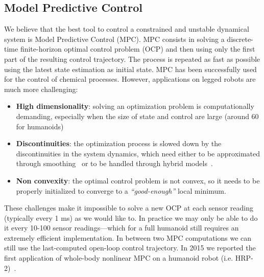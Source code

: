 \subsection{Model Predictive Control}
We believe that the best tool to control a constrained and unstable dynamical system is Model Predictive Control (MPC).
MPC consists in solving a discrete-time finite-horizon optimal control problem (OCP) and then using only the first part of the resulting control trajectory.
The process is repeated as fast as possible using the latest state estimation as initial state.
MPC has been successfully used for the control of chemical processes.
However, applications on legged robots are much more challenging:
\begin{itemize}
\item \textbf{High dimensionality}: solving an optimization problem is computationally demanding, especially when the size of state and control are large (around 60 for humanoids)
\item \textbf{Discontinuities}: the optimization process is slowed down by the discontinuities in the system dynamics, which need either to be approximated through smoothing~\cite{Todorov} or to be handled through hybrid models~\cite{Diehl2009a}.
\item \textbf{Non convexity}: the optimal control problem is not convex, so it needs to be properly initialized to converge to a \emph{``good-enough''} local minimum.
\end{itemize}
These challenges make it impossible to solve a new OCP at each sensor reading (typically every 1 ms) as we would like to. 
In practice we may only be able to do it every 10-100 sensor readings---which for a full humanoid still requires an extremely efficient implementation. 
In between two MPC computations we can still use the last-computed open-loop control trajectory.
In 2015 we reported the first application of whole-body nonlinear MPC on a humanoid robot (i.e. HRP-2)~\cite{Koenemann2015}.
